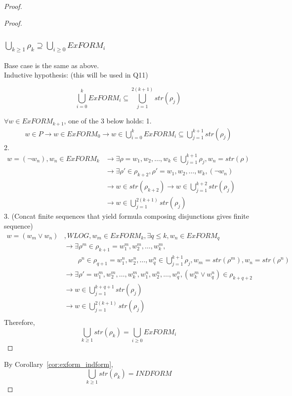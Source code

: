 \documentclass{article}
\newtheorem{lemma}[theorem]{Lemma}
\let\oldlemma\lemma
\let\endoldlemma\endlemma
\renewenvironment{lemma}
  {\begin{tcolorbox}[
      colback=green!8,
      colframe=green!50!black,
      boxrule=0.6pt,
      arc=2pt,
      left=6pt,right=6pt,top=4pt,bottom=4pt
    ]\oldlemma}
  {\endoldlemma\end{tcolorbox}}
\begin{document}
\begin{proof}
\begin{proof}
        \subsubsection*{$\bigcup_{k \geq 1} \rho_k \supseteq \bigcup_{i\geq 0} ExFORM_i$}
        Base case is the same as above. \\
        Inductive hypothesis: (this will be used in Q11)
        \begin{lemma}
        \[\bigcup_{i = 0}^k ExFORM_i \subseteq  \bigcup_{j=1}^{2(k+1)}str(\rho_j) \]
        \end{lemma}
        $\forall w \in ExFORM_{k+1}$, one of the 3 below holds:
        1. 
        \begin{align*}
            w \in P \rightarrow w \in ExFORM_0 \rightarrow w \in \bigcup_{i = 0}^k ExFORM_i \subseteq \bigcup_{j=1}^{k+1}str(\rho_j)
        \end{align*}
        2. 
        \begin{align*}
            w = (\neg w_n), w_n \in ExFORM_{k} &\rightarrow \exists \rho = w_1, w_2, \dots, w_k \in \bigcup_{j=1}^{k+1}\rho_j, w_n = str(\rho) \\
            &\rightarrow \exists \rho' \in \rho_{k+2}, \rho' = w_1, w_2, \dots, w_k, (\neg w_n)\\ 
            &\rightarrow w \in str(\rho_{k+2}) \rightarrow w \in \bigcup_{j=1}^{k+2}str(\rho_j)\\
            &\rightarrow w \in \bigcup_{j=1}^{2(k+1)}str(\rho_j)
        \end{align*}
        3. (Concat finite sequences that yield formula composing disjunctions gives finite sequence)
        \begin{align*}
            w = (w_m \lor w_n)&, WLOG, w_m \in ExFORM_{k}, \exists q \leq k, w_n \in ExFORM_q \\
            &\rightarrow \exists \rho^m \in \rho_{k+1} = w^m_1, w^m_2, \dots, w^m_k, \\
            & \qquad \rho^n \in \rho_{q+1}= w^n_1, w^n_2, \dots, w^n_q \in \bigcup_{j=1}^{k+1}\rho_j, w_m = str(\rho^m),  w_n = str(\rho^n)\\
            &\rightarrow \exists \rho' = w^m_1, w^m_2, \dots, w^m_k, w^n_1, w^n_2, \dots, w_q^n, (w^m_k \lor w^n_q) \in \rho_{k + q + 2} \\
            &\rightarrow w \in \bigcup_{j=1}^{k+q+1}str(\rho_j)\\
            &\rightarrow w \in \bigcup_{j=1}^{2(k+1)}str(\rho_j)\\
        \end{align*}
        Therefore, 
    \[\bigcup_{k \geq 1} str(\rho_k) = \bigcup_{i\geq 0} ExFORM_i\] 
    \end{proof}
By Corollary~\ref{cor:exform_indform}, 
    \[\bigcup_{k \geq 1} str(\rho_k) = INDFORM\]
\end{proof}
\end{document}
